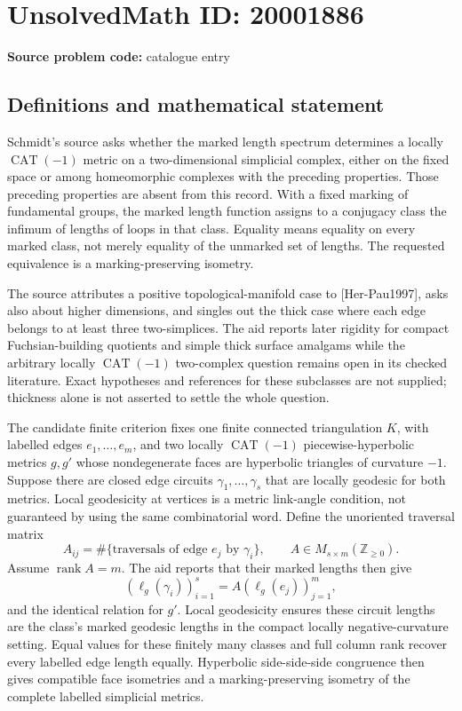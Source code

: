 \documentclass[11pt]{article}
\newcommand{\Z}{\mathbb{Z}}
\begin{document}
\section*{UnsolvedMath ID: 20001886}
\textbf{Source problem code:} catalogue entry
\subsection{Definitions and mathematical statement}
Schmidt's source asks whether the marked length spectrum determines a locally \(\operatorname{CAT}(-1)\) metric on a two-dimensional simplicial complex, either on the fixed space or among homeomorphic complexes with the preceding properties. Those preceding properties are absent from this record. With a fixed marking of fundamental groups, the marked length function assigns to a conjugacy class the infimum of lengths of loops in that class. Equality means equality on every marked class, not merely equality of the unmarked set of lengths. The requested equivalence is a marking-preserving isometry.

The source attributes a positive topological-manifold case to [Her-Pau1997], asks also about higher dimensions, and singles out the thick case where each edge belongs to at least three two-simplices. The aid reports later rigidity for compact Fuchsian-building quotients and simple thick surface amalgams while the arbitrary locally \(\operatorname{CAT}(-1)\) two-complex question remains open in its checked literature. Exact hypotheses and references for these subclasses are not supplied; thickness alone is not asserted to settle the whole question.

The candidate finite criterion fixes one finite connected triangulation \(K\), with labelled edges \(e_1,\ldots,e_m\), and two locally \(\operatorname{CAT}(-1)\) piecewise-hyperbolic metrics \(g,g'\) whose nondegenerate faces are hyperbolic triangles of curvature \(-1\). Suppose there are closed edge circuits \(\gamma_1,\ldots,\gamma_s\) that are locally geodesic for both metrics. Local geodesicity at vertices is a metric link-angle condition, not guaranteed by using the same combinatorial word. Define the unoriented traversal matrix
\[
 A_{ij}=\#\{\text{traversals of edge }e_j\text{ by }\gamma_i\},
 \qquad A\in M_{s\times m}(\Z_{\ge0}).
\]
Assume \(\operatorname{rank}A=m\). The aid reports that their marked lengths then give
\[
 (\ell_g(\gamma_i))_{i=1}^s=A(\ell_g(e_j))_{j=1}^m,
\]
and the identical relation for \(g'\). Local geodesicity ensures these circuit lengths are the class's marked geodesic lengths in the compact locally negative-curvature setting. Equal values for these finitely many classes and full column rank recover every labelled edge length equally. Hyperbolic side-side-side congruence then gives compatible face isometries and a marking-preserving isometry of the complete labelled simplicial metrics.
\end{document}
